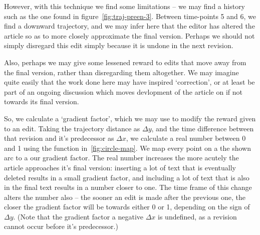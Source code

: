 However, with this technique we find some limitations -- we may find a
history such as the one found in
figure~\ref{fig:traj-preen-3}. Between time-points 5 and 6, we find a
downward trajectory, and we may infer here that the editor has altered
the article so as to more closely approximate the final
version. Perhaps we should not simply disregard this edit simply
because it is undone in the next revision. 

Also, perhaps we may give some lessened reward to edits that move away
from the final version, rather than disregarding them altogether. We
may imagine quite easily that the work done here may have inspired
`correction', or at least be part of an ongoing discussion which moves
devlopment of the article on if not towards its final version. %


So, we calculate a `gradient factor', which we may use to modify the
reward given to an edit. Taking the trajectory distance as $\Delta y$,
and the time difference between that revision and it's predecessor as
$\Delta x$, we calculate a real number between 0 and 1 using the
function in~\ref{fig:circle-map}. We map every point on a the shown
arc to a our gradient factor. The real number increases the more
acutely the article approaches it's final version: inserting a lot of
text that is eventually deleted results in a small gradient factor,
and including a lot of text that is also in the final text results in
a number closer to one. The time frame of this change alters the
number also -- the sooner an edit is made after the previous one, the
closer the gradient factor will be towards either 0 or 1, depending on
the sign of $\Delta y$. (Note that the gradient factor a negative
$\Delta x$ is undefined, as a revision cannot occur before it's
predecessor.)

